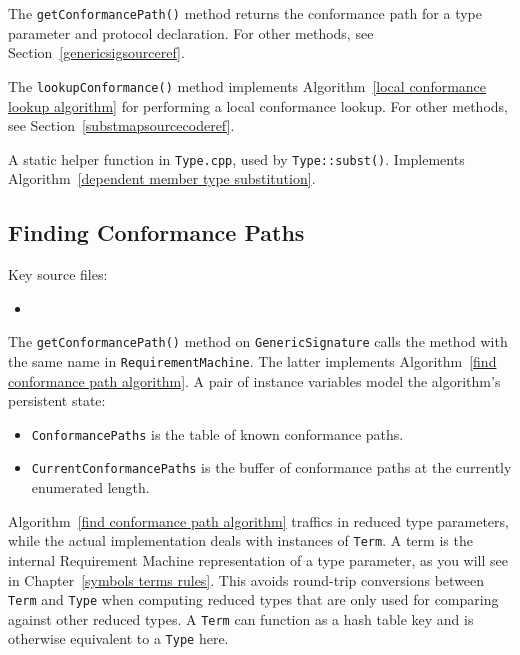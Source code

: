\documentclass[../generics]{subfiles}
\begin{document}
The \verb|getConformancePath()| method returns the conformance path for a type parameter and protocol declaration. For other methods, see Section~\ref{genericsigsourceref}.

The \verb|lookupConformance()| method implements Algorithm~\ref{local conformance lookup algorithm} for performing a local conformance lookup. For other methods, see Section~\ref{substmapsourcecoderef}.

A static helper function in \verb|Type.cpp|, used by \verb|Type::subst()|. Implements Algorithm~\ref{dependent member type substitution}.

\subsection*{Finding Conformance Paths}

Key source files:
\begin{itemize}
\item {}
\end{itemize}
The \verb|getConformancePath()| method on \verb|GenericSignature| calls the method with the same name in \verb|RequirementMachine|. The latter implements Algorithm~\ref{find conformance path algorithm}. A pair of instance variables model the algorithm's persistent state:
\begin{itemize}
\item \verb|ConformancePaths| is the table of known conformance paths.
\item \verb|CurrentConformancePaths| is the buffer of conformance paths at the currently enumerated length.
\end{itemize}
Algorithm~\ref{find conformance path algorithm} traffics in reduced type parameters, while the actual implementation deals with instances of \verb|Term|. A term is the internal Requirement Machine representation of a type parameter, as you will see in Chapter~\ref{symbols terms rules}. This avoids round-trip conversions between \verb|Term| and \verb|Type| when computing reduced types that are only used for comparing against other reduced types. A \verb|Term| can function as a hash table key and is otherwise equivalent to a \verb|Type| here.
\end{document}
